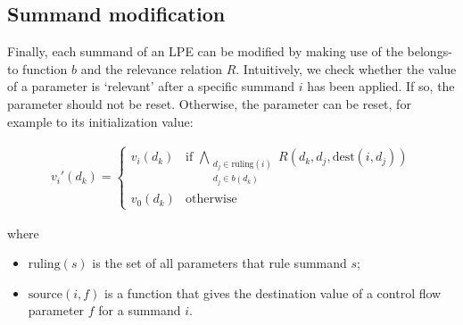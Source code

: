 \clearpage
\subsection{Summand modification}

Finally, each summand of an LPE can be modified by making use of the belongs-to function $b$ and the relevance relation $R$.
Intuitively, we check whether the value of a parameter is `relevant' after a specific summand $i$ has been applied.
If so, the parameter should not be reset.
Otherwise, the parameter can be reset, for example to its initialization value:

\begin{align*}
v_{i}{'}(d_k) = \begin{cases}
v_{i}(d_k) & \text{if } \bigwedge\limits_{\substack{d_j \in \text{ruling}(i) \\ d_j \in b(d_k)}}^{} R(d_k, d_j, \text{dest}(i, d_j)) \\
v_{0}(d_k) & \text{otherwise}
\end{cases}
\end{align*}

where

\begin{itemize}
\item $\text{ruling}(s)$ is the set of all parameters that rule summand $s$;
\item $\text{source}(i, f)$ is a function that gives the destination value of a control flow parameter $f$ for a summand $i$.
\end{itemize}

